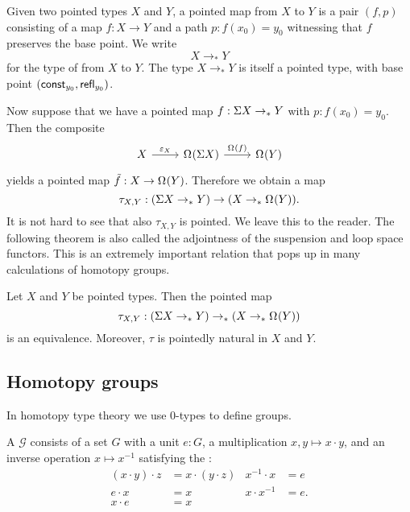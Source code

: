 \begin{defn}
  Given two pointed types $X$ and $Y$, a pointed map from $X$ to $Y$ is a pair $(f,p)$ consisting of a map $f:X\to Y$ and a path $p:f(x_0)=y_0$ witnessing that $f$ preserves the base point. We write
  \begin{equation*}
    X\to_\ast Y
  \end{equation*}
  for the type of  from $X$ to $Y$. The type $X\to_\ast Y$ is itself a pointed type, with base point $(\mathsf{const}_{y_0},\mathsf{refl}_{y_0})$. 
\end{defn}

Now suppose that we have a pointed map $f:\Sigma X\to_\ast Y$ with $p:f(x_0)=y_0$. Then the composite
\begin{equation*}
  \begin{tikzcd}
    X \arrow[r,"\varepsilon_X"] & \loopspace{\susp{X}} \arrow[r,"\loopspace{f}"] & \loopspace{Y}
  \end{tikzcd}
\end{equation*}
yields a pointed map $\tilde{f}:X\to\Omega^{}(Y)$. Therefore we obtain a map
\begin{equation*}
  \tau_{X,Y} :(\Sigma X \to_\ast Y) \to (X \to_\ast \Omega^{}(Y)).
\end{equation*}
It is not hard to see that also $\tau_{X,Y}$ is pointed. We leave this to the reader. The following theorem is also called the adjointness of the suspension and loop space functors. This is an extremely important relation that pops up in many calculations of homotopy groups.

\begin{thm}
  Let $X$ and $Y$ be pointed types. Then the pointed map
  \begin{equation*}
    \tau_{X,Y} : (\Sigma X \to_\ast Y) \to_\ast (X\to_\ast \Omega^{}(Y))
  \end{equation*}
  is an equivalence. Moreover, $\tau$ is pointedly natural in $X$ and $Y$. 
\end{thm}

\subsection{Homotopy groups}
In homotopy type theory we use $0$-types to define groups.
\begin{defn}
A  $\mathcal{G}$ consists of a set $G$ with a unit $e:G$, a multiplication $x,y\mapsto x\cdot y$, and an inverse operation $x\mapsto x^{-1}$ satisfying the :
\begin{align*}
(x\cdot y)\cdot z & =x\cdot(y\cdot z) & x^{-1}\cdot x & = e \\
e\cdot x & = x & x\cdot x^{-1} & = e. \\
x\cdot e & =x
\end{align*}
\end{defn}

